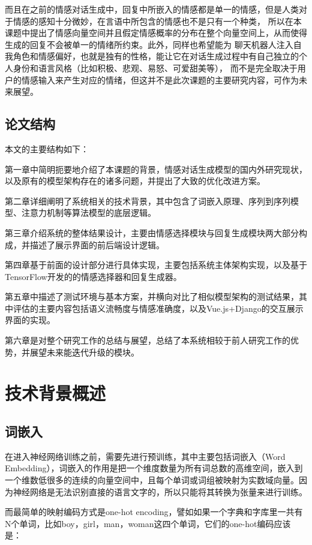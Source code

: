 \documentclass[supercite]{HustGraduPaper}
\theoremstyle{definition}
\begin{document}
而且在之前的情感对话生成中，回复中所嵌入的情感都是单一的情感，但是人类对于情感的感知十分微妙，在言语中所包含的情感也不是只有一个种类，
所以在本课题中提出了情感向量空间\cite{bao2019cyclegan}并且假定情感概率的分布在整个向量空间上，从而使得生成的回复不会被单一的情绪所约束。此外，同样也希望能为
聊天机器人注入自我角色和情感偏好，也就是独有的性格，能让它在对话生成过程中有自己独立的个人身份和语言风格\cite{li2016persona}（比如积极、悲观、易怒、可爱甜美等），
而不是完全取决于用户的情感输入来产生对应的情绪，但这并不是此次课题的主要研究内容，可作为未来展望。




\subsection{论文结构}
本文的主要结构如下：

第一章中简明扼要地介绍了本课题的背景，情感对话生成模型的国内外研究现状，以及原有的模型架构存在的诸多问题，并提出了大致的优化改进方案。

第二章详细阐明了系统相关的技术背景，其中包含了词嵌入原理、序列到序列模型、注意力机制等算法模型的底层逻辑。

第三章介绍系统的整体结果设计，主要由情感选择模块与回复生成模块两大部分构成，并描述了展示界面的前后端设计逻辑。

第四章基于前面的设计部分进行具体实现，主要包括系统主体架构实现，以及基于TensorFlow开发的的情感选择器和回复生成器。

第五章中描述了测试环境与基本方案，并横向对比了相似模型架构的测试结果，其中评估的主要内容包括语义流畅度与情感准确度，以及Vue.js+Django的交互展示界面的实现。

第六章是对整个研究工作的总结与展望，总结了本系统相较于前人研究工作的优势，并展望未来能迭代升级的模块。


\section{技术背景概述} 
\subsection{词嵌入}
在进入神经网络训练之前，需要先进行预训练，其中主要包括词嵌入（Word Embedding），词嵌入的作用是把一个维度数量为所有词总数的高维空间，嵌入到
一个维数低很多的连续的向量空间中，且每个单词或词组被映射为实数域向量。因为神经网络是无法识别直接的语言文字的，所以只能将其转换为张量来进行训练。

而最简单的映射编码方式是one-hot encoding，譬如如果一个字典和字库里一共有N个单词，比如boy，girl，man，woman这四个单词，它们的one-hot编码应该是：
\end{document}
